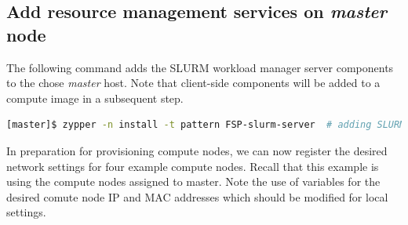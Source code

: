 \documentclass[letterpaper]{article}
\begin{document}


\subsection{Add resource management services on {\em master} node}

The following command adds the SLURM workload manager server components to the
chose {\em master} host. Note that client-side components will be added to a
compute image in a subsequent step.


\begin{lstlisting}[language=bash,keywords={}]
[master]$ zypper -n install -t pattern FSP-slurm-server  # adding SLURM server support
\end{lstlisting}


In preparation for provisioning compute nodes, we can now register the desired
network settings for four example compute nodes. Recall that this example is
using the compute nodes assigned to master. Note the use of variables for the
desired comute node IP and MAC addresses which should be modified for local
settings. 

\vspace*{0.2cm}
\end{document}
